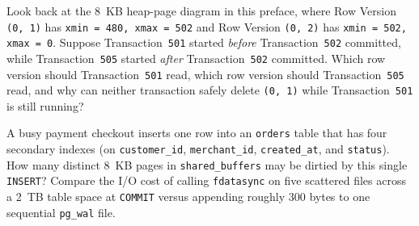 \begin{exercise}
Look back at the 8~KB heap-page diagram in this preface, where Row Version \texttt{(0, 1)} has \texttt{xmin = 480, xmax = 502} and Row Version \texttt{(0, 2)} has \texttt{xmin = 502, xmax = 0}. Suppose Transaction~\texttt{501} started \emph{before} Transaction~\texttt{502} committed, while Transaction~\texttt{505} started \emph{after} Transaction~\texttt{502} committed. Which row version should Transaction~\texttt{501} read, which row version should Transaction~\texttt{505} read, and why can neither transaction safely delete \texttt{(0, 1)} while Transaction~\texttt{501} is still running?
\end{exercise}

\begin{exercise}
A busy payment checkout inserts one row into an \texttt{orders} table that has four secondary indexes (on \texttt{customer\_id}, \texttt{merchant\_id}, \texttt{created\_at}, and \texttt{status}). How many distinct 8~KB pages in \texttt{shared\_buffers} may be dirtied by this single \texttt{INSERT}? Compare the I/O cost of calling \texttt{fdatasync} on five scattered files across a 2~TB table space at \texttt{COMMIT} versus appending roughly 300 bytes to one sequential \texttt{pg\_wal} file.
\end{exercise}

\chapterline
